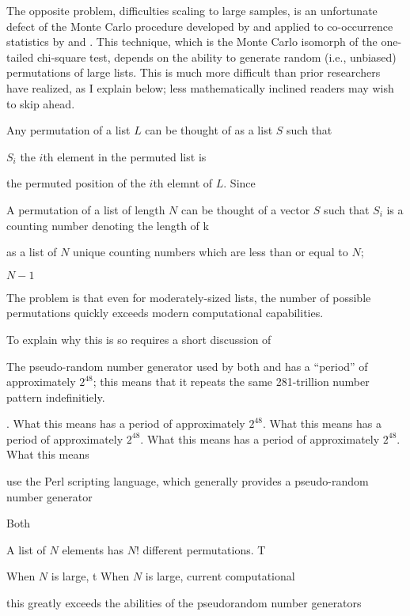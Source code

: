 The opposite problem, difficulties scaling to large samples, is an unfortunate defect of the Monte Carlo procedure developed by \citet{Kessler2001} and applied to co-occurrence statistics by \citet{Martin2007,Martin2011} and \citet{Brown2010}. This technique, which is the Monte Carlo isomorph of the one-tailed chi-square test, depends on the ability to generate random (i.e., unbiased) permutations of large lists. This is much more difficult than prior researchers have realized, as I explain below; less mathematically inclined readers may wish to skip ahead. 

Any permutation of a list $L$ can be thought of as a list $S$ such that 

$S_i$ 
the $i$th element in the permuted list is 


the permuted position of the $i$th elemnt of $L$. Since 


A permutation of a list of length $N$ can be thought of a vector $S$ such that $S_i$ is a counting number denoting the length of k

as a list of $N$ unique counting numbers which are less than or equal to $N$; 



$N - 1$ 

The problem is that even for moderately-sized lists, the number of possible permutations quickly exceeds modern computational capabilities. 




To explain why this is so requires a short discussion of


The pseudo-random number generator used by both \citeauthor{Martin2011} and \citeauthor{Brown2010} has a ``period'' of approximately $2 ^ 48$; this means that it repeats the same 281-trillion number pattern indefinitiely. 



. What this means has a period of approximately $2 ^ 48$. What this means has a period of approximately $2 ^ 48$. What this means has a period of approximately $2 ^ 48$. What this means 

use the Perl scripting language, which generally provides a pseudo-random number generator 




Both 

A list of $N$ elements has $N!$ different permutations. T

When $N$ is large, t
When $N$ is large, current computational 

this greatly exceeds the abilities of the pseudorandom number generators 

